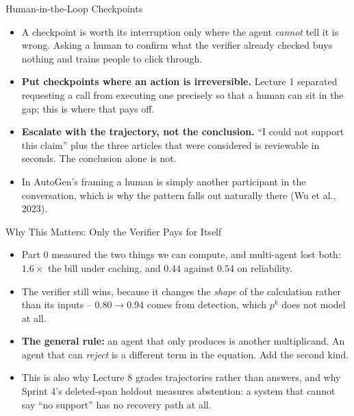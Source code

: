\begin{frame}{Human-in-the-Loop Checkpoints}
\begin{itemize}
  \item A checkpoint is worth its interruption only where the agent \emph{cannot} tell it is wrong. Asking a human to confirm what the verifier already checked buys nothing and trains people to click through.
  \pause
  \item \textbf{Put checkpoints where an action is irreversible.} Lecture 1 separated requesting a call from executing one precisely so that a human can sit in the gap; this is where that pays off.
  \pause
  \item \textbf{Escalate with the trajectory, not the conclusion.} ``I could not support this claim'' plus the three articles that were considered is reviewable in seconds. The conclusion alone is not.
  \pause
  \item In AutoGen's framing a human is simply another participant in the conversation, which is why the pattern falls out naturally there (Wu et al., 2023).
\end{itemize}
\end{frame}

\begin{frame}{Why This Matters: Only the Verifier Pays for Itself}
\begin{itemize}
  \item Part 0 measured the two things we can compute, and multi-agent lost both: $1.6\times$ the bill under caching, and $0.44$ against $0.54$ on reliability.
  \pause
  \item The verifier still wins, because it changes the \emph{shape} of the calculation rather than its inputs -- $0.80 \to 0.94$ comes from detection, which $p^{k}$ does not model at all.
  \pause
  \item \textbf{The general rule:} an agent that only produces is another multiplicand. An agent that can \emph{reject} is a different term in the equation. Add the second kind.
  \pause
  \item This is also why Lecture 8 grades trajectories rather than answers, and why Sprint 4's deleted-span holdout measures abstention: a system that cannot say ``no support'' has no recovery path at all.
\end{itemize}
\end{frame}

